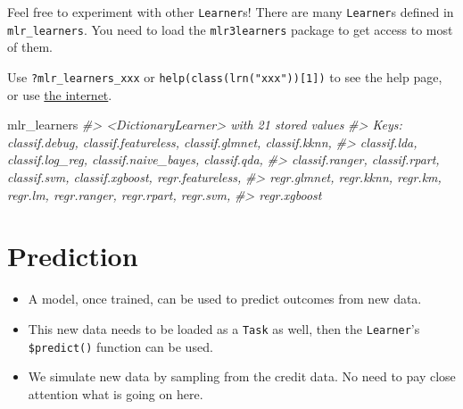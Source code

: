 \documentclass[]{article}
\newenvironment{Shaded}{\begin{snugshade}}{\end{snugshade}}
\newcommand{\CommentTok}[1]{\textcolor[rgb]{0.56,0.35,0.01}{\textit{#1}}}
\newcommand{\DataTypeTok}[1]{\textcolor[rgb]{0.13,0.29,0.53}{#1}}
\newcommand{\DecValTok}[1]{\textcolor[rgb]{0.00,0.00,0.81}{#1}}
\newcommand{\KeywordTok}[1]{\textcolor[rgb]{0.13,0.29,0.53}{\textbf{#1}}}
\newcommand{\NormalTok}[1]{#1}
\newcommand{\OperatorTok}[1]{\textcolor[rgb]{0.81,0.36,0.00}{\textbf{#1}}}
\newcommand{\OtherTok}[1]{\textcolor[rgb]{0.56,0.35,0.01}{#1}}
\newcommand{\StringTok}[1]{\textcolor[rgb]{0.31,0.60,0.02}{#1}}
\providecommand{\tightlist}{%
  \setlength{\itemsep}{0pt}\setlength{\parskip}{0pt}}
\begin{document}
Feel free to experiment with other \texttt{Learner}s! There are many
\texttt{Learner}s defined in \texttt{mlr\_learners}. You need to load
the \texttt{mlr3learners} package to get access to most of them.

Use \texttt{?mlr\_learners\_xxx} or
\texttt{help(class(lrn("xxx")){[}1{]})} to see the help page, or use
\href{https://mlr3learners.mlr-org.com/reference/index.html}{the
internet}.

\begin{Shaded}
\begin{Highlighting}[]
\NormalTok{mlr_learners}
\CommentTok{#> <DictionaryLearner> with 21 stored values}
\CommentTok{#> Keys: classif.debug, classif.featureless, classif.glmnet, classif.kknn,}
\CommentTok{#>   classif.lda, classif.log_reg, classif.naive_bayes, classif.qda,}
\CommentTok{#>   classif.ranger, classif.rpart, classif.svm, classif.xgboost, regr.featureless,}
\CommentTok{#>   regr.glmnet, regr.kknn, regr.km, regr.lm, regr.ranger, regr.rpart, regr.svm,}
\CommentTok{#>   regr.xgboost}
\end{Highlighting}
\end{Shaded}

\hypertarget{prediction}{%
\section{Prediction}\label{prediction}}

\begin{itemize}
\tightlist
\item
  A model, once trained, can be used to predict outcomes from new data.
\item
  This new data needs to be loaded as a \texttt{Task} as well, then the
  \texttt{Learner}'s \texttt{\$predict()} function can be used.
\item
  We simulate new data by sampling from the credit data. No need to pay
  close attention what is going on here.
\end{itemize}

\begin{Shaded}
\end{Shaded}
\end{document}
